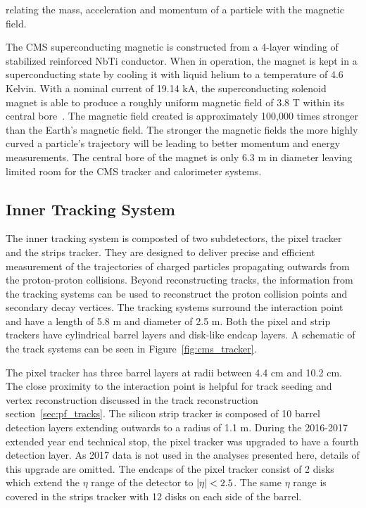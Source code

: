 relating the mass, acceleration and momentum of a particle with the magnetic field.

The CMS superconducting magnetic is constructed from a 4-layer winding of stabilized
reinforced NbTi conductor. When in operation, the magnet is kept in a superconducting state
by cooling it with liquid helium to a temperature of 4.6 Kelvin. With a nominal current
of 19.14 kA, the superconducting solenoid magnet is able to produce a roughly uniform
magnetic field of 3.8 T within its central bore~\cite{Chatrchyan:2008zzk}. The magnetic field created is approximately
100,000 times stronger than the Earth's magnetic field. The stronger the magnetic fields the
more highly curved a particle's trajectory will be leading to better momentum and energy measurements.
The central bore of the magnet is only 6.3 m in diameter
leaving limited room for the CMS tracker and calorimeter systems.



\subsection{Inner Tracking System}
The inner tracking system is composted of two subdetectors, the pixel tracker and the
strips tracker. They are designed to deliver precise and efficient measurement of
the trajectories of charged particles propagating outwards from the 
proton-proton collisions. Beyond reconstructing tracks, the information from the
tracking systems can be used to reconstruct the 
proton collision points and secondary decay vertices. The
tracking systems surround the interaction point and have a length of 5.8 m and 
diameter of 2.5 m. Both the pixel and strip trackers have cylindrical barrel
layers and disk-like endcap layers. A schematic of the track systems
can be seen in Figure~\ref{fig:cms_tracker}.

The pixel tracker has three barrel layers at radii between 4.4 cm and 10.2 cm. The
close proximity to the interaction point is helpful for track seeding and vertex
reconstruction discussed in the track reconstruction section~\ref{sec:pf_tracks}.
The silicon strip tracker is composed of 10 barrel detection layers extending 
outwards to a radius of 1.1 m. During the 2016-2017 extended year end technical stop,
the pixel tracker was upgraded to have a fourth detection layer. As 2017 data is not used
in the analyses presented here, details of this upgrade are omitted.
The endcaps of the pixel tracker consist of 2 disks which extend the $\eta$ 
range of the detector to $\lvert\eta\rvert < 2.5$. The same $\eta$ range is covered in the
strips tracker with 12 disks on each side of the barrel.

